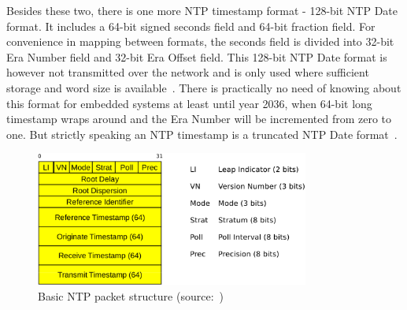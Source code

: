 Besides these two, there is one more NTP timestamp format - 128-bit NTP Date format.
It includes a 64-bit signed seconds field and 64-bit fraction field.
For convenience in mapping between formats,
the seconds field is divided into 32-bit Era Number field
and 32-bit Era Offset field.
This 128-bit NTP Date format is however not transmitted over the network
and is only used where sufficient storage and word size is available~\cite{rfc5905}.
There is practically no need of knowing about this format for embedded systems
at least until year 2036, when 64-bit long timestamp wraps around and
the Era Number will be incremented from zero to one.
But strictly speaking an NTP timestamp is a truncated NTP Date format~\cite{rfc5905}.

\begin{figure}
	\centering
	\includegraphics[width=9cm,keepaspectratio]{fig/ntp-packet.pdf}
	\caption{Basic NTP packet structure (source:~\cite{ntp-arch})}
	\label{fig:ntp-packet}
	\bigskip
\end{figure}

